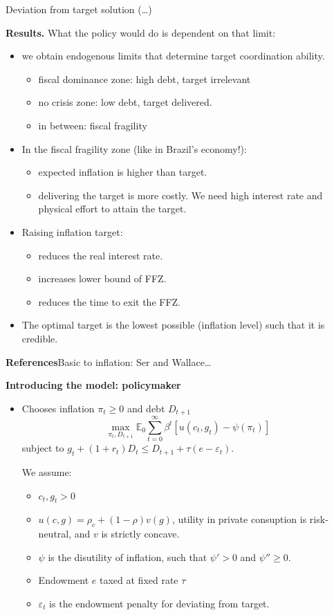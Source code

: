 \noindent
Deviation from target solution (…)

\medskip\noindent
{\bf Results.} What the policy would do is
dependent on that limit:

\begin{itemize}
\item we obtain endogenous limits that determine
target coordination ability.

\begin{itemize}
\item fiscal dominance zone: high debt,
target irrelevant
\item no crisis zone: low debt, target
delivered.
\item in between: fiscal fragility
\end{itemize}

\item In the fiscal fragility zone (like in
Brazil's economy!):
\begin{itemize}
\item expected inflation is higher than
target.
\item delivering the target is more costly.
We need high interest rate and physical
effort to attain the target.
\end{itemize}

\item Raising inflation target:
\begin{itemize}
\item reduces the real interest rate.
\item increases lower bound of FFZ.
\item reduces the time to exit the FFZ.
\end{itemize}

\item The optimal target is the lowest
possible (inflation level) such that 
it is credible.
\end{itemize}

\medskip\noindent
{\bf References}Basic to inflation: Ser and
Wallace…

\medskip\noindent
{\bf Introducing the model: policymaker}
\begin{itemize}
\item Chooses inflation $\pi_t \geq 0$
and debt $D_{t+1}$
$$
\operatorname{max}_{\pi_t,D_{t+1}}
\mathbb{E}_0 \sum_{t=0}^\infty 
\beta^t[u(c_t,g_t)-\psi(\pi_t)]
$$
subject to $g_t+(1+r_t) D_t \leq 
D_{t+1}+\tau(e-\varepsilon_t)$.

We assume:
\begin{itemize}
\item $c_t,g_t>0$
\item $u(c,g)=\rho_c+(1-\rho)v(g)$, utility
in private consuption is risk-neutral,
and $v$ is strictly concave.
\item $\psi$ is the disutility of inflation,
such that $\psi'>0$ and $\psi'' \geq 0$.
\item Endowment $e$ taxed at fixed rate $\tau$
\item $\varepsilon_t$ is the endowment
penalty for deviating from target.
\end{itemize}
\end{itemize}

